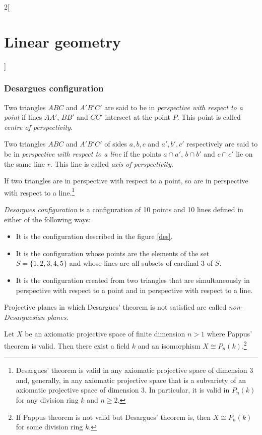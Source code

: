 \documentclass[class=article,10pt,crop=false]{standalone}
\begin{document}
\begin{multicols}{2}[\section{Linear geometry}]
\subsubsection{Desargues configuration}
\begin{definition}
Two triangles $ABC$ and $A'B'C'$ are said to be in \textit{perspective with respect to a point} if lines $AA'$, $BB'$ and $CC'$ intersect at the point $P$. This point is called \textit{centre of perspectivity}.
\end{definition}
\begin{definition}
Two triangles $ABC$ and $A'B'C'$ of sides $a,b,c$ and $a',b',c'$ respectively are said to be in \textit{perspective with respect to a line} if the points $a\cap a'$, $b\cap b'$ and $c\cap c'$ lie on the same line $r$. This line is called \textit{axis of perspectivity}.
\end{definition}
\begin{theorem}
If two triangles are in perspective with respect to a point, so are in perspective with respect to a line.\footnote{Desargues' theorem is valid in any axiomatic projective space of dimension 3 and, generally, in any axiomatic projective space that is a subvariety of an axiomatic projective space of dimension 3. In particular, it is valid in $P_n(k)$ for any division ring $k$ and $n\geq2$.}
\end{theorem}
\begin{definition}
\textit{Desargues configuration} is a configuration of 10 points and 10 lines defined in either of the following ways:
\begin{itemize}
    \item It is the configuration described in the figure \ref{des}.
    \begin{figure}[ht] 
        \centering 
    \end{figure}
    \item It is the configuration whose points are the elements of the set $S=\{1,2,3,4,5\}$ and whose lines are all subsets of cardinal 3 of $S$.
    \item It is the configuration created from two triangles that are simultaneously in perspective with respect to a point and in perspective with respect to a line. 
\end{itemize}
\end{definition}
\begin{definition}
Projective planes in which Desargues' theorem is not satisfied are called \textit{non-Desarguesian planes}.
\end{definition}
\begin{theorem}
Let $X$ be an axiomatic projective space of finite dimension $n>1$ where Pappus' theorem is valid. Then there exist a field $k$ and an isomorphism $X\cong P_n(k)$.\footnote{If Pappus theorem is not valid but Desargues' theorem is, then $X\cong P_n(k)$ for some division ring $k$.}
\end{theorem}

\end{multicols}
\end{document}
